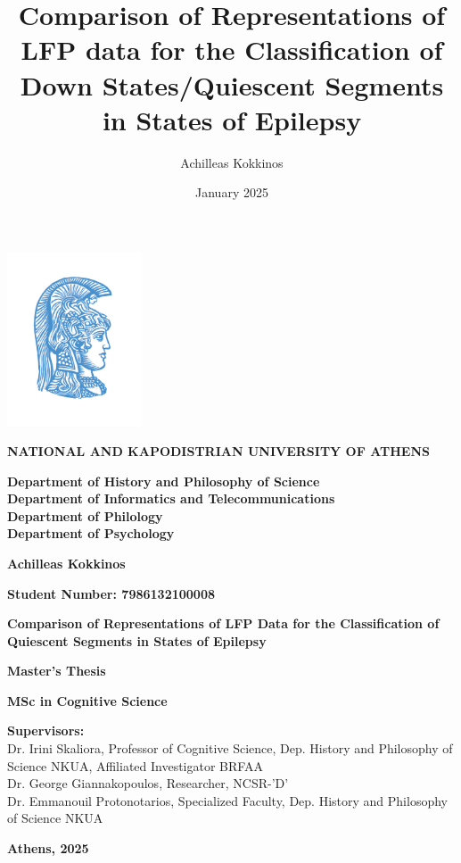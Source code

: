 \documentclass{article}
\title{Comparison of Representations of LFP data for the Classification of Down States/Quiescent Segments in States of Epilepsy}
\author{Achilleas Kokkinos}
\date{January 2025}
\begin{document}
\begin{titlepage}
    \centering
    \includegraphics[width=0.3\textwidth]{LOGO_UOA COL2.jpg}\\
    \vspace*{1cm}
    
    \textbf{\LARGE NATIONAL AND KAPODISTRIAN UNIVERSITY OF ATHENS}
    
    \vspace{1cm}
    
    \textbf{Department of History and Philosophy of Science}\\
    \textbf{Department of Informatics and Telecommunications}\\
    \textbf{Department of Philology}\\
    \textbf{Department of Psychology}
    
    \vspace{1cm}
    
    \textbf{\Large Achilleas Kokkinos}
    
    \vfill
    
    \textbf{\Large Student Number: 7986132100008}
    
    \vfill
    
    {\huge \textbf{Comparison of Representations of LFP Data for the Classification of Quiescent Segments in States of Epilepsy}}
    
    \vfill
    
    \textbf{\Large Master’s Thesis}
    
    \vfill
    
    \textbf{\Large MSc in Cognitive Science}
    
    \vfill
    
    \textbf{Supervisors:}\\
    Dr. Irini Skaliora, Professor of Cognitive Science, Dep. History and Philosophy of Science NKUA, Affiliated Investigator BRFAA\\
    Dr. George Giannakopoulos, Researcher, NCSR-’D’\\
    Dr. Emmanouil Protonotarios, Specialized Faculty, Dep. History and Philosophy of Science NKUA
    
    \vfill
    \textbf{Athens, 2025}

\end{titlepage}
\end{document}
